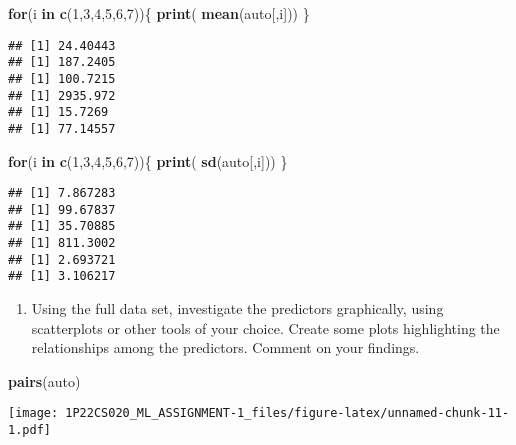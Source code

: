 \documentclass[
]{article}
\newenvironment{Shaded}{\begin{snugshade}}{\end{snugshade}}
\newcommand{\ControlFlowTok}[1]{\textcolor[rgb]{0.13,0.29,0.53}{\textbf{#1}}}
\newcommand{\DecValTok}[1]{\textcolor[rgb]{0.00,0.00,0.81}{#1}}
\newcommand{\FunctionTok}[1]{\textcolor[rgb]{0.13,0.29,0.53}{\textbf{#1}}}
\newcommand{\NormalTok}[1]{#1}
\providecommand{\tightlist}{%
  \setlength{\itemsep}{0pt}\setlength{\parskip}{0pt}}
\begin{document}
\begin{Shaded}
\begin{Highlighting}[]
\ControlFlowTok{for}\NormalTok{(i }\ControlFlowTok{in} \FunctionTok{c}\NormalTok{(}\DecValTok{1}\NormalTok{,}\DecValTok{3}\NormalTok{,}\DecValTok{4}\NormalTok{,}\DecValTok{5}\NormalTok{,}\DecValTok{6}\NormalTok{,}\DecValTok{7}\NormalTok{))\{}
 \FunctionTok{print}\NormalTok{( }\FunctionTok{mean}\NormalTok{(auto[,i]))}
\NormalTok{\}}
\end{Highlighting}
\end{Shaded}

\begin{verbatim}
## [1] 24.40443
## [1] 187.2405
## [1] 100.7215
## [1] 2935.972
## [1] 15.7269
## [1] 77.14557
\end{verbatim}

\begin{Shaded}
\begin{Highlighting}[]
\ControlFlowTok{for}\NormalTok{(i }\ControlFlowTok{in} \FunctionTok{c}\NormalTok{(}\DecValTok{1}\NormalTok{,}\DecValTok{3}\NormalTok{,}\DecValTok{4}\NormalTok{,}\DecValTok{5}\NormalTok{,}\DecValTok{6}\NormalTok{,}\DecValTok{7}\NormalTok{))\{}
 \FunctionTok{print}\NormalTok{( }\FunctionTok{sd}\NormalTok{(auto[,i]))}
\NormalTok{\}}
\end{Highlighting}
\end{Shaded}

\begin{verbatim}
## [1] 7.867283
## [1] 99.67837
## [1] 35.70885
## [1] 811.3002
## [1] 2.693721
## [1] 3.106217
\end{verbatim}

\begin{enumerate}
\def\labelenumi{(\alph{enumi})}
\setcounter{enumi}{4}
\tightlist
\item
  Using the full data set, investigate the predictors graphically, using
  scatterplots or other tools of your choice. Create some plots
  highlighting the relationships among the predictors. Comment on your
  findings.
\end{enumerate}

\begin{Shaded}
\begin{Highlighting}[]
\FunctionTok{pairs}\NormalTok{(auto)}
\end{Highlighting}
\end{Shaded}

\texttt{[image: 1P22CS020\_ML\_ASSIGNMENT-1\_files/figure-latex/unnamed-chunk-11-1.pdf]}
\end{document}
